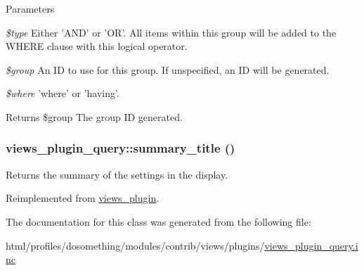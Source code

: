 \begin{DoxyParams}{Parameters}
\item[{\em \$type}]Either 'AND' or 'OR'. All items within this group will be added to the WHERE clause with this logical operator. \item[{\em \$group}]An ID to use for this group. If unspecified, an ID will be generated. \item[{\em \$where}]'where' or 'having'.\end{DoxyParams}
\begin{DoxyReturn}{Returns}
\$group The group ID generated. 
\end{DoxyReturn}
\hypertarget{classviews__plugin__query_a501630ab900fb802d83366fd4a76b646}{
\subsubsection[{summary\_\-title}]{\setlength{\rightskip}{0pt plus 5cm}views\_\-plugin\_\-query::summary\_\-title ()}}
\label{classviews__plugin__query_a501630ab900fb802d83366fd4a76b646}
Returns the summary of the settings in the display. 

Reimplemented from \hyperlink{classviews__plugin_a9a4aaece48a7cf465dd95d59a3bc5ea1}{views\_\-plugin}.

The documentation for this class was generated from the following file:\begin{DoxyCompactItemize}
\item 
html/profiles/dosomething/modules/contrib/views/plugins/\hyperlink{views__plugin__query_8inc}{views\_\-plugin\_\-query.inc}\end{DoxyCompactItemize}
